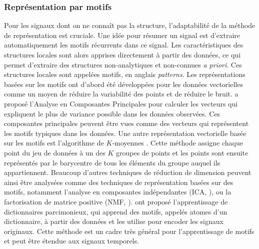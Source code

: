\documentclass[../thesis.tex]{subfiles}
\begin{document}
\subsubsection{Représentation par motifs}


	Pour les signaux dont on ne connaît pas la structure, l'adaptabilité de la méthode
	de représentation est cruciale. Une idée pour résumer un signal est d'extraire
	automatiquement les motifs récurrents dans ce signal. Les caractéristiques des
	structures locales sont alors apprises directement à partir des données, ce qui
	permet d'extraire des structures non-analytiques et non-connues \emph{a priori}.
	Ces structures locales sont appelées motifs, en anglais \emph{patterns}. Les représentations
	basées sur les motifs ont d'abord été développées pour les données vectorielles comme un
	moyen de réduire la variabilité des points et de réduire le bruit. \citet{hotelling1933analysis}
	a proposé l'Analyse en Composantes Principales pour calculer les vecteurs
	qui expliquent le plus de variance possible dans les données observées. Ces
	composantes principales peuvent être vues comme des vecteurs qui représentent les
	motifs typiques dans les données. Une autre représentation vectorielle basée sur
	les motifs est l'algorithme de $K$-moyennes \citep{Macqueen1967}. Cette méthode
	assigne chaque point du jeu de données à un des $K$ groupes de points et les points
	sont ensuite représentés par le barycentre de tous les éléments du groupe auquel
	ils appartiennent. Beaucoup d'autres techniques de réduction de dimension peuvent
	ainsi être analysées comme des techniques de représentation basées sur des motifs,
	notamment l'analyse en composantes indépendantes (ICA, \citealt{Jutten1991}), ou la
	factorisation de matrice positive (NMF, \citealt{Paatero1994}). \citet{Olshausen1997}
	ont proposé l'apprentissage de dictionnaires parcimonieux, qui apprend des motifs,
	appelés atomes d'un dictionnaire, à partir des données et les utilise pour encoder
	les signaux originaux. Cette méthode est un cadre très général pour l'apprentissage
	de motifs et peut être étendue aux signaux temporels.
\end{document}
